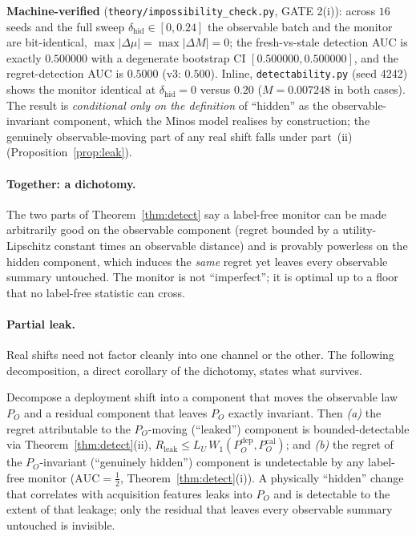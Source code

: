 \textbf{Machine-verified} (\texttt{theory/impossibility\_check.py}, GATE 2(i)): across $16$ seeds and
the full sweep $\delta_{\mathrm{hid}}\in[0,0.24]$ the observable batch and the monitor are bit-identical,
$\max|\Delta\mu|=\max|\Delta M|=0$; the fresh-vs-stale detection AUC is exactly $0.500000$ with a
degenerate bootstrap CI $[0.500000,0.500000]$, and the regret-detection AUC is $0.5000$ (v3: $0.500$).
Inline, \texttt{detectability.py} (seed 4242) shows the monitor identical at $\delta_{\mathrm{hid}}=0$
versus $0.20$ ($M=0.007248$ in both cases).
The result is \emph{conditional only on the definition} of ``hidden'' as the observable-invariant
component, which the Minos model realises by construction; the genuinely observable-moving part of any
real shift falls under part~(ii) (Proposition~\ref{prop:leak}).

\paragraph{Together: a dichotomy.}
The two parts of Theorem~\ref{thm:detect} say a label-free monitor can be made arbitrarily good on the
observable component (regret bounded by a utility-Lipschitz constant times an observable distance) and
is provably powerless on the hidden component, which induces the \emph{same} regret yet leaves every
observable summary untouched. The monitor is not ``imperfect''; it is optimal up to a floor that no
label-free statistic can cross.

\paragraph{Partial leak.}
Real shifts need not factor cleanly into one channel or the other. The following decomposition, a
direct corollary of the dichotomy, states what survives.

\begin{proposition}
\label{prop:leak}
Decompose a deployment shift into a component that moves the observable law $P_O$ and a residual
component that leaves $P_O$ exactly invariant. Then \emph{(a)} the regret attributable to the
$P_O$-moving (``leaked'') component is bounded-detectable via Theorem~\ref{thm:detect}(ii),
$R_{\mathrm{leak}}\le L_U\,W_1(P_O^{\mathrm{dep}},P_O^{\mathrm{cal}})$; and \emph{(b)} the regret of the
$P_O$-invariant (``genuinely hidden'') component is undetectable by any label-free monitor
($\mathrm{AUC}=\tfrac12$, Theorem~\ref{thm:detect}(i)). A physically ``hidden'' change that correlates
with acquisition features leaks into $P_O$ and is detectable to the extent of that leakage; only the
residual that leaves every observable summary untouched is invisible.
\end{proposition}

